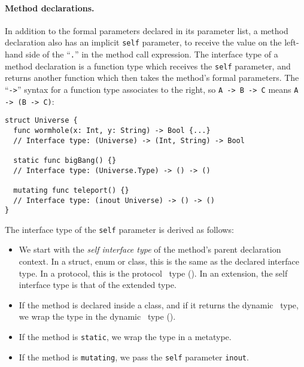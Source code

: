 \documentclass[../generics]{subfiles}
\begin{document}
\paragraph{Method declarations.}
In addition to the formal parameters declared in its parameter list, a method declaration also has an implicit \texttt{self} parameter, to receive the value on the left-hand side of the ``\texttt{.}'' in the method call expression. The interface type of a method declaration is a function type which receives the \texttt{self} parameter, and returns another function which then takes the method's formal parameters. The ``\texttt{->}'' syntax for a function type associates to the right, so \verb|A -> B -> C| means \verb|A -> (B -> C)|:
\begin{Verbatim}
struct Universe {
  func wormhole(x: Int, y: String) -> Bool {...}
  // Interface type: (Universe) -> (Int, String) -> Bool

  static func bigBang() {}
  // Interface type: (Universe.Type) -> () -> ()

  mutating func teleport() {}
  // Interface type: (inout Universe) -> () -> ()
}
\end{Verbatim}
The interface type of the \texttt{self} parameter is derived as follows:
\begin{itemize}
\item We start with the \emph{self interface type} of the method's parent declaration context. In a struct, enum or class, this is the same as the declared interface type. In a protocol, this is the protocol \IndexSelf\tSelf\ type (). In an extension, the self interface type is that of the extended type.

\item If the method is declared inside a class, and if it returns the dynamic \tSelf\ type, we wrap the type in the dynamic \tSelf\ type ().

\item If the method is \texttt{static}, we wrap the type in a metatype.

\item If the method is \texttt{mutating}, we pass the \texttt{self} parameter \texttt{inout}.

\end{itemize}
\end{document}
